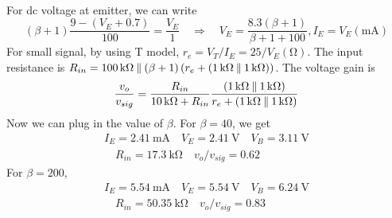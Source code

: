 \documentclass[12pt, a4paper]{article}
\begin{document}
\Ans \\
For dc voltage at emitter, we can write
\[
  (\beta+1)\frac{9 - (V_E + 0.7)}{100} = \frac{V_E}{1} \quad \Rightarrow \quad
  V_E = \frac{8.3(\beta+1)}{\beta + 1 + 100}, I_E = V_E (\si{\mA})
\]
For small signal, by using T model, $r_e = V_T/I_E = 25/V_E (\si{\ohm})$.
The input resistance is $R_{in} = \SI{100}{\kohm} \paral (\beta+1)\left(
r_e + (\SI{1}{\kohm} \paral \SI{1}{\kohm}) \right)$. The voltage gain is
\[
  \frac{v_o}{v_{sig}} = \frac{R_{in}}{\SI{10}{\kohm} + R_{in}}
  \frac{(\SI{1}{\kohm} \paral \SI{1}{\kohm})}{r_e + (\SI{1}{\kohm} \paral \SI{1}{\kohm})}
\]
Now we can plug in the value of $\beta$. For $\beta = 40$, we get
\begin{gather*}
  I_E = \SI{2.41}{\mA} \quad V_E = \SI{2.41}{\V} \quad V_B = \SI{3.11}{\V} \\
  \quad R_{in} = \SI{17.3}{\kohm} \quad v_o / v_{sig} = 0.62
\end{gather*}
For $\beta = 200$, 
\begin{gather*}
  I_E = \SI{5.54}{\mA} \quad V_E = \SI{5.54}{\V} \quad V_B = \SI{6.24}{\V} \\
  \quad R_{in} = \SI{50.35}{\kohm} \quad v_o / v_{sig} = 0.83
\end{gather*}
\end{document}
